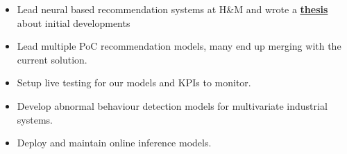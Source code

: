 \documentclass[10pt,a4paper,ragged2e]{texfiles/altacv}
\begin{document}

\begin{fullwidth}
\makecvheader
\end{fullwidth}




\begin{itemize}
    \item Lead neural based recommendation systems at H\&M and wrote a \href{https://github.com/jiwidi/MASTER_THESIS/blob/master/thesis.pdf}{\textbf{thesis}} about initial developments 
    \item Lead multiple PoC recommendation models, many end up merging with the current solution.
    \item Setup live testing for our models and KPIs to monitor.
\end{itemize}

\vspace{10px}

\begin{itemize}
    \item Develop abnormal behaviour detection models for multivariate industrial systems.
    \item Deploy and maintain online inference models.
\end{itemize}
\end{document}
